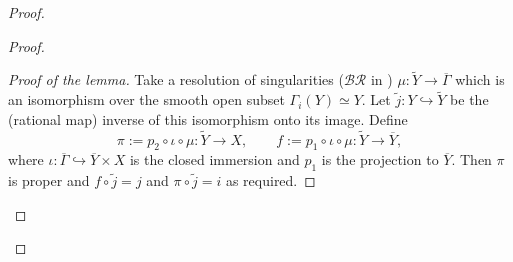 \begin{remark}
\begin{proof}
\begin{enumerate}
\begin{proof}
\begin{proof}[Proof of the lemma]
                          Take a resolution of singularities ($\mathcal{BR}$ in \cite[Thm.~36]{kollar-seattle}) $\mu:\widetilde Y\to \overline{\Gamma}$ which is an isomorphism
                          over the smooth open subset $\Gamma_i(Y)\simeq Y$.
                          Let $\widetilde j:Y\hookrightarrow \widetilde Y$ be the (rational map) inverse of this isomorphism onto its image.
                          Define
                          \[
                              \pi := p_2\circ \iota\circ \mu:\widetilde Y\to X,\qquad
                              f := p_1\circ \iota\circ \mu:\widetilde Y\to \overline Y,
                          \]
                          where $\iota:\overline{\Gamma}\hookrightarrow \overline Y\times X$ is the closed immersion and
                          $p_1$ is the projection to $\overline Y$.
                          Then $\pi$ is proper and $f\circ \widetilde j = j$ and $\pi\circ \widetilde j = i$ as required.
                      \end{proof}

                      \medskip


\end{proof}
\end{enumerate}
\end{proof}
\end{remark}
